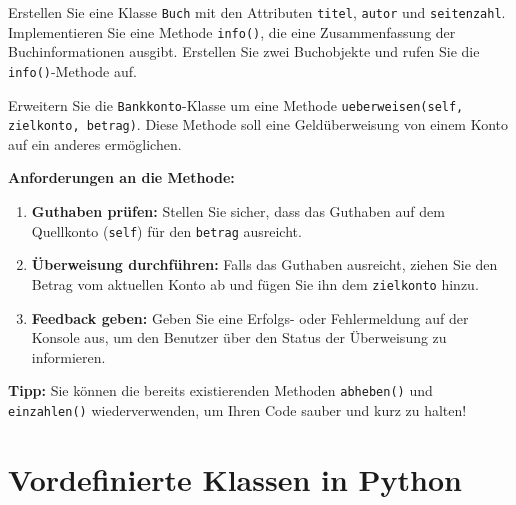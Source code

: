 \begin{myexercise}
	Erstellen Sie eine Klasse \lstinline|Buch| mit den Attributen \lstinline|titel|, \lstinline|autor| und \lstinline|seitenzahl|. Implementieren Sie eine Methode \lstinline|info()|, die eine Zusammenfassung der Buchinformationen ausgibt. Erstellen Sie zwei Buchobjekte und rufen Sie die \lstinline|info()|-Methode auf.

	\begin{myanswer}
		
	\end{myanswer}
\end{myexercise}

\begin{myexercise}
	Erweitern Sie die \lstinline|Bankkonto|-Klasse um eine Methode \lstinline|ueberweisen(self, zielkonto, betrag)|. Diese Methode soll eine Geldüberweisung von einem Konto auf ein anderes ermöglichen.

	\textbf{Anforderungen an die Methode:}
	\begin{enumerate}
		\item \textbf{Guthaben prüfen:} Stellen Sie sicher, dass das Guthaben auf dem Quellkonto (\lstinline|self|) für den \lstinline|betrag| ausreicht.
		\item \textbf{Überweisung durchführen:} Falls das Guthaben ausreicht, ziehen Sie den Betrag vom aktuellen Konto ab und fügen Sie ihn dem \lstinline|zielkonto| hinzu.
		\item \textbf{Feedback geben:} Geben Sie eine Erfolgs- oder Fehlermeldung auf der Konsole aus, um den Benutzer über den Status der Überweisung zu informieren.
	\end{enumerate}

	\textbf{Tipp:} Sie können die bereits existierenden Methoden \lstinline|abheben()| und \lstinline|einzahlen()| wiederverwenden, um Ihren Code sauber und kurz zu halten! %

	\begin{myanswer}
		
	\end{myanswer}
\end{myexercise}

\section{Vordefinierte Klassen in Python}

